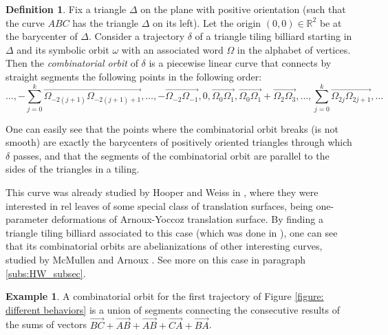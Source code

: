 \documentclass[12pt]{article}
\theoremstyle{definition}
\newtheorem{definition}{Definition}
\newtheorem*{example}{Example}
\begin{document}
\begin{definition}
Fix a triangle $\Delta$ on the plane with positive orientation (such that the curve $ABC$ has the triangle $\Delta$ on its left). Let the origin $(0,0) \in \mathbb{R}^2$ be at the barycenter of $\Delta$. Consider a trajectory $\delta$ of a triangle tiling billiard starting in $\Delta$ and its symbolic orbit $\omega$ with an associated word $\Omega$ in the alphabet of vertices. Then the \emph{combinatorial orbit }of $\delta$ is a piecewise linear curve that connects by straight segments the following points in the following order:
\begin{equation*}
\ldots, -\sum_{j=0}^{k} \overrightarrow{{\Omega}_{-2(j+1)} {\Omega}_{-2(j+1)+1}}
 ,\ldots,-\overrightarrow{{\Omega}_{-2} {\Omega}_{-1}},0,\overrightarrow{{\Omega}_0 {\Omega}_1},\overrightarrow{{\Omega}_0 {\Omega}_1}+\overrightarrow{{\Omega}_2 {\Omega}_3}, \ldots, 
\sum_{j=0}^{k} \overrightarrow{{\Omega}_{2j} {\Omega}_{2j+1}}, \ldots
\end{equation*}
\end{definition}
One can easily see that the points where the combinatorial orbit  breaks (is not smooth) are exactly the barycenters of positively oriented triangles through which $\delta$ passes, and that the segments of the combinatorial orbit are parallel to the sides of the triangles in a tiling.

This curve was already studied by Hooper and Weiss in \cite{HW18}, where they were interested in rel leaves of some special class of translation surfaces, being one-parameter deformations of Arnoux-Yoccoz translation surface. By finding a triangle tiling billiard associated to this case (which was done in \cite{BDFI18}), one can see that its combinatorial orbits are abelianizations of other interesting curves, studied by McMullen \cite{M12} and Arnoux \cite{ABB11, A88}. See more on this case in paragraph \ref{subs:HW_subsec}.


\begin{example}
A combinatorial orbit for the first trajectory of Figure \ref{figure: different behaviors} is a union of segments connecting the consecutive results of the sums of vectors $\overrightarrow{BC}+\overrightarrow{AB}+\overrightarrow{AB}+\overrightarrow{CA}+\overrightarrow{BA}$.
\end{example}
\end{document}
